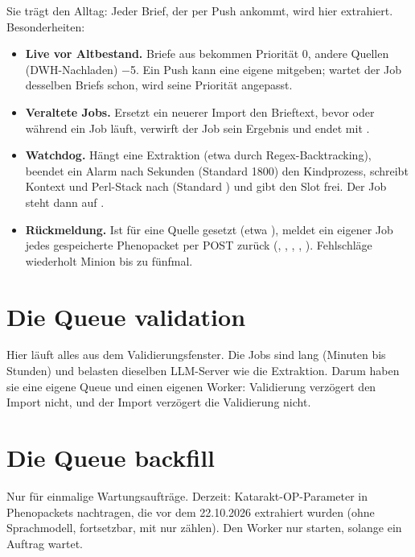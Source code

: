 \documentclass[11pt,a4paper,parskip=half-,headings=standardclasses,toc=bibliography,open=any]{scrreprt}
\begin{document}
Sie trägt den Alltag: Jeder Brief, der per Push ankommt, wird hier extrahiert. Besonderheiten:

\begin{itemize}
  \item \textbf{Live vor Altbestand.} Briefe aus  bekommen Priorität 0, andere Quellen (DWH-Nachladen) $-$5. Ein Push kann eine eigene  mitgeben; wartet der Job desselben Briefs schon, wird seine Priorität angepasst.
  \item \textbf{Veraltete Jobs.} Ersetzt ein neuerer Import den Brieftext, bevor oder während ein Job läuft, verwirft der Job sein Ergebnis und endet mit .
  \item \textbf{Watchdog.} Hängt eine Extraktion (etwa durch Regex-Backtracking), beendet ein Alarm nach  Sekunden (Standard 1800) den Kindprozess, schreibt Kontext und Perl-Stack nach  (Standard ) und gibt den Slot frei. Der Job steht dann auf .
  \item \textbf{Rückmeldung.} Ist für eine Quelle  gesetzt (etwa ), meldet ein eigener Job jedes gespeicherte Phenopacket per POST zurück (, , , , ). Fehlschläge wiederholt Minion bis zu fünfmal.
\end{itemize}

\section{Die Queue validation}

Hier läuft alles aus dem Validierungsfenster. Die Jobs sind lang (Minuten bis Stunden) und belasten dieselben LLM-Server wie die Extraktion. Darum haben sie eine eigene Queue und einen eigenen Worker: Validierung verzögert den Import nicht, und der Import verzögert die Validierung nicht.

\section{Die Queue backfill}

Nur für einmalige Wartungsaufträge. Derzeit: Katarakt-OP-Parameter in Phenopackets nachtragen, die vor dem 22.10.2026 extrahiert wurden (ohne Sprachmodell, fortsetzbar, mit  nur zählen). Den Worker nur starten, solange ein Auftrag wartet.
\end{document}
